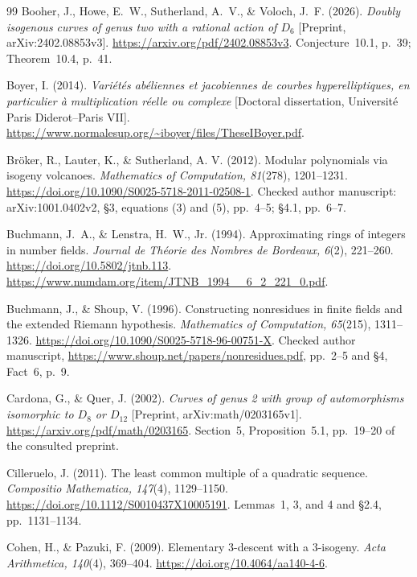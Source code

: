 \documentclass[11pt]{article}
\theoremstyle{definition}
\theoremstyle{remark}
\begin{document}
\begin{thebibliography}{99}
Booher, J., Howe, E.~W., Sutherland, A.~V., \& Voloch, J.~F. (2026).
\emph{Doubly isogenous curves of genus two with a rational action of $D_6$}
[Preprint, arXiv:2402.08853v3].
\url{https://arxiv.org/pdf/2402.08853v3}.
Conjecture~10.1, p.~39; Theorem~10.4, p.~41.

Boyer, I. (2014).
\emph{Vari\'et\'es ab\'eliennes et jacobiennes de courbes hyperelliptiques,
en particulier \`a multiplication r\'eelle ou complexe}
[Doctoral dissertation, Universit\'e Paris Diderot--Paris VII].
\url{https://www.normalesup.org/~iboyer/files/TheseIBoyer.pdf}.

Br\"oker, R., Lauter, K., \& Sutherland, A. V. (2012).
Modular polynomials via isogeny volcanoes.
\emph{Mathematics of Computation, 81}(278), 1201--1231.
\url{https://doi.org/10.1090/S0025-5718-2011-02508-1}.
Checked author manuscript: arXiv:1001.0402v2, \S3, equations (3)
and (5), pp.~4--5; \S4.1, pp.~6--7.

Buchmann, J.~A., \& Lenstra, H.~W., Jr. (1994).
Approximating rings of integers in number fields.
\emph{Journal de Th\'eorie des Nombres de Bordeaux, 6}(2), 221--260.
\url{https://doi.org/10.5802/jtnb.113}.
\url{https://www.numdam.org/item/JTNB_1994__6_2_221_0.pdf}.

Buchmann, J., \& Shoup, V. (1996).
Constructing nonresidues in finite fields and the extended Riemann hypothesis.
\emph{Mathematics of Computation, 65}(215), 1311--1326.
\url{https://doi.org/10.1090/S0025-5718-96-00751-X}.
Checked author manuscript, \url{https://www.shoup.net/papers/nonresidues.pdf},
pp.~2--5 and \S4, Fact~6, p.~9.

Cardona, G., \& Quer, J. (2002).
\emph{Curves of genus 2 with group of automorphisms isomorphic to
$D_8$ or $D_{12}$} [Preprint, arXiv:math/0203165v1].
\url{https://arxiv.org/pdf/math/0203165}.
Section~5, Proposition~5.1, pp.~19--20 of the consulted preprint.

Cilleruelo, J. (2011).
The least common multiple of a quadratic sequence.
\emph{Compositio Mathematica, 147}(4), 1129--1150.
\url{https://doi.org/10.1112/S0010437X10005191}.
Lemmas~1, 3, and 4 and \S2.4, pp.~1131--1134.

Cohen, H., \& Pazuki, F. (2009).
Elementary 3-descent with a 3-isogeny.
\emph{Acta Arithmetica, 140}(4), 369--404.
\url{https://doi.org/10.4064/aa140-4-6}.


\end{thebibliography}
\end{document}
